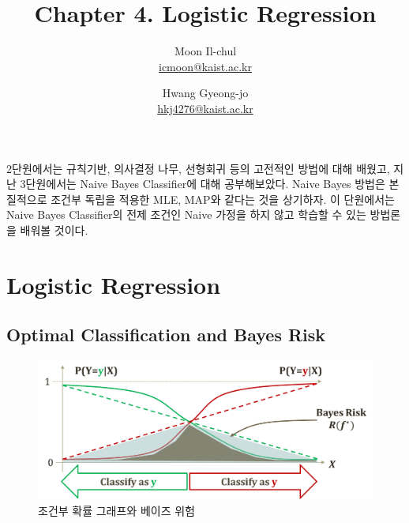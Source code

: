 \documentclass[a4paper]{oblivoir}
\author{Moon Il-chul \\ \href{mailto:icmoon@kaist.ac.kr}{icmoon@kaist.ac.kr} 
   \and Hwang Gyeong-jo
 \\ \href{mailto:hkj4276@kaist.ac.kr}{hkj4276@kaist.ac.kr} }
\title{Chapter 4. Logistic Regression}
\begin{document}
\maketitle
\tableofcontents

\section*{}
2단원에서는 규칙기반, 의사결정 나무, 선형회귀 등의 고전적인 방법에 대해 배웠고, 지난 3단원에서는 Naive Bayes Classifier에 대해 공부해보았다. Naive Bayes 방법은 본질적으로 조건부 독립을 적용한 MLE, MAP와 같다는 것을 상기하자. 이 단원에서는 Naive Bayes Classifier의 전제 조건인 Naive 가정을 하지 않고 학습할 수 있는 방법론을 배워볼 것이다.

\section{Logistic Regression}

\subsection{Optimal Classification and Bayes Risk}
\begin{figure}[ht]
\centering
\includegraphics[scale=0.6]{Bayes_Risk.png}
\caption{조건부 확률 그래프와 베이즈 위험}
\label{Figure 4-1}
\end{figure}
\end{document}
